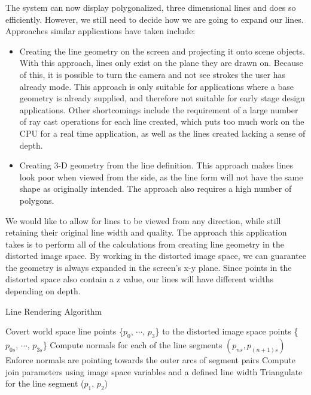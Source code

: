 \documentclass[11pt]{report}
\begin{document}
The system can now display polygonalized, three dimensional lines and does so efficiently.
However, we still need to decide how we are going to expand our lines.
Approaches similar applications have taken include: 
\begin{itemize}
\item Creating the line geometry on the screen and projecting it onto scene objects. With this approach, lines only exist on the plane they are drawn on. Because of this, it is possible to turn the camera and not see strokes the user has already mode. This approach is only suitable for applications where a base geometry is already supplied, and therefore not suitable for early stage design applications. Other shortcomings include the requirement of a large number of ray cast operations for each line created, which puts too much work on the CPU for a real time application, as well as the lines created lacking a sense of depth.
\item Creating 3-D geometry from the line definition. This approach makes lines look poor when viewed from the side, as the line form will not have the same shape as originally intended. The approach also requires a high number of polygons.
\end{itemize}

We would like to allow for lines to be viewed from any direction, while still retaining their original line width and quality.
The approach this application takes is to perform all of the calculations from creating line geometry in the distorted image space.
By working in the distorted image space, we can guarantee the geometry is always expanded in the screen's x-y plane.
Since points in the distorted space also contain a z value, our lines will have different widths depending on depth.

\begin{algorithm}[H]
\caption{Line Rendering Algorithm}
\begin{algorithmic}[1]
\State Covert world space line points \{$p_0$, $\cdots$, $p_3$\} to the distorted image space points \{$p_{0s}$, $\cdots$, $p_{3s}$\}
\State Compute normals for each of the line segments $(p_{ns},p_{(n+1)s})$
\State Enforce normals are pointing towards the outer arcs of segment pairs
\State Compute join parameters using image space variables and a defined line width
\State Triangulate for the line segment ($p_1$, $p_2$)
\EndFor
\end{algorithmic}
\end{algorithm}
\end{document}
